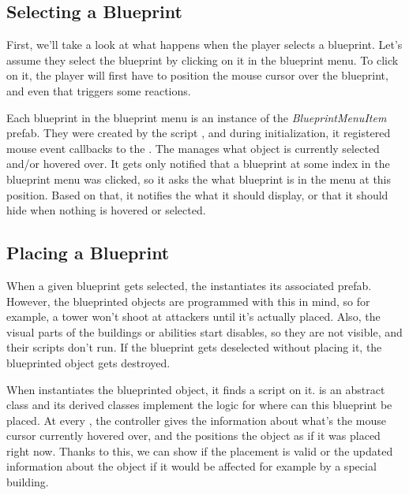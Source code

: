 \subsection{Selecting a Blueprint}

First, we'll take a look at what happens when the player selects a blueprint.
Let's assume they select the blueprint by clicking on it in the blueprint menu.
To click on it, the player will first have to position the mouse cursor over the blueprint, and even that triggers some reactions.

Each blueprint in the blueprint menu is an instance of the \emph{BlueprintMenuItem} prefab.
They were created by the script , and during initialization, it registered mouse event callbacks to the .
The  manages what object is currently selected and/or hovered over.
It gets only notified that a blueprint at some index in the blueprint menu was clicked, so it asks the  what blueprint is in the menu at this position.
Based on that, it notifies the  what it should display, or that it should hide when nothing is hovered or selected.

\subsection{Placing a Blueprint}

When a given blueprint gets selected, the  instantiates its associated prefab.
However, the blueprinted objects are programmed with this in mind, so for example, a tower won't shoot at attackers until it's actually placed.
Also, the visual parts of the buildings or abilities start disables, so they are not visible, and their scripts don't run.
If the blueprint gets deselected without placing it, the blueprinted object gets destroyed.

When  instantiates the blueprinted object, it finds a  script on it.
 is an abstract class and its derived classes implement the logic for where can this blueprint be placed.
At every , the  controller gives the  information about what's the mouse cursor currently hovered over, and the  positions the object as if it was placed right now.
Thanks to this, we can show if the placement is valid or the updated information about the object if it would be affected for example by a special building.

